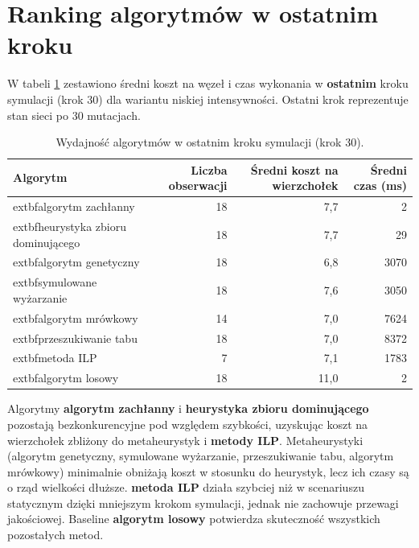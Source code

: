 \section{Ranking algorytmów w ostatnim kroku}

W tabeli \ref{tab:dynamic_final_step} zestawiono średni koszt na węzeł i czas wykonania w \textbf{ostatnim} kroku symulacji (krok 30) dla wariantu niskiej intensywności. Ostatni krok reprezentuje stan sieci po 30 mutacjach.

\begin{table}[H]
  \centering
  \begin{tabular}{|l|r|r|r|}
    \hline
    \textbf{Algorytm}                     & \textbf{Liczba obserwacji} & \textbf{Średni koszt na wierzchołek} & \textbf{Średni czas (ms)} \\
    \hline
    extbf{algorytm zachłanny}             & 18                         & 7,7                                  & 2                         \\
    extbf{heurystyka zbioru dominującego} & 18                         & 7,7                                  & 29                        \\
    extbf{algorytm genetyczny}            & 18                         & 6,8                                  & 3070                      \\
    extbf{symulowane wyżarzanie}          & 18                         & 7,6                                  & 3050                      \\
    extbf{algorytm mrówkowy}              & 14                         & 7,0                                  & 7624                      \\
    extbf{przeszukiwanie tabu}            & 18                         & 7,0                                  & 8372                      \\
    extbf{metoda ILP}                     & 7                          & 7,1                                  & 1783                      \\
    extbf{algorytm losowy}                & 18                         & 11,0                                 & 2                         \\
    \hline
  \end{tabular}
  \caption{Wydajność algorytmów w ostatnim kroku symulacji (krok 30).}
  \label{tab:dynamic_final_step}
\end{table}

Algorytmy \textbf{algorytm zachłanny} i \textbf{heurystyka zbioru dominującego} pozostają bezkonkurencyjne pod względem szybkości, uzyskując koszt na wierzchołek zbliżony do metaheurystyk i \textbf{metody ILP}. Metaheurystyki (algorytm genetyczny, symulowane wyżarzanie, przeszukiwanie tabu, algorytm mrówkowy) minimalnie obniżają koszt w stosunku do heurystyk, lecz ich czasy są o rząd wielkości dłuższe. \textbf{metoda ILP} działa szybciej niż w scenariuszu statycznym dzięki mniejszym krokom symulacji, jednak nie zachowuje przewagi jakościowej. Baseline \textbf{algorytm losowy} potwierdza skuteczność wszystkich pozostałych metod.

